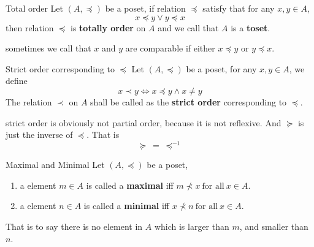 \newpage

\begin{definition}{Total order}{}
    Let $(A,\preceq)$ be a poset, if relation $\preceq$ satisfy that for any $x,y \in A$,
    \begin{equation*}
        x \preceq y \lor y \preceq x
    \end{equation*}
    then relation $\preceq$ is \textbf{totally order} on $A$ and we call that $A$ is a \textbf{toset}.
\end{definition}

\begin{remarks}
    sometimes we call that $x$ and $y$ are comparable if either $x \preceq y$ or $y \preceq x$.
\end{remarks}
\begin{definition}{Strict order corresponding to $\preceq$}{}
    Let $(A,\preceq)$ be a poset, for any $x,y \in A$, we define
    \begin{equation*}
        x \prec y \iff  x \preceq y \land x \neq y
    \end{equation*}
    The relation $\prec$ on $A$ shall be called as the \textbf{strict order} corresponding to $\preceq$.
\end{definition}

\begin{remarks}
    strict order is obviously not partial order, because it is not reflexive. And $\succeq$ is just the inverse of $\preceq$. That is
    \begin{equation*}
        \succeq \ = \ \preceq^{-1}
    \end{equation*}
\end{remarks}

\begin{definition}{Maximal and Minimal}{}
    Let $(A,\preceq)$ be a poset, 
        \begin{enumerate}

            \item a element $m \in A$ is called a \textbf{maximal} iff $m \nprec x \ \text{for all}\ x \in A$.
            \item a element $n \in A$ is called a \textbf{minimal} iff $x \nprec n \ \text{for all}\ x \in A$.

        \end{enumerate}

    That is to say there is no element in $A$ which is larger than $m$, and smaller than $n$.
\end{definition}

